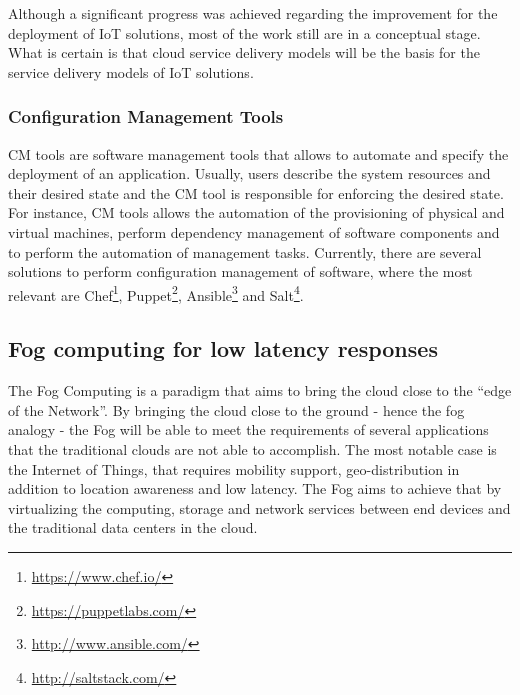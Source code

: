 Although a significant progress was achieved regarding the improvement for the deployment of \gls{IoT}
solutions, most of the work still are in a conceptual stage. What is certain is that cloud service
delivery models will be the basis for the service delivery models of \gls{IoT} solutions.

\subsubsection{Configuration Management Tools}
\label{subs:cm_tools}
\gls{CM} tools are software management tools that allows to automate and specify the deployment of an
application. Usually, users describe the system resources and their desired state and the \gls{CM}
tool is responsible for enforcing the desired state. For instance, \gls{CM} tools allows the automation
of the provisioning of physical and virtual machines, perform dependency management of software
components and to perform the automation of management tasks. Currently, there are several solutions
to perform configuration management of software, where the most relevant are Chef\footnote{\url{https://www.chef.io/}},
Puppet\footnote{\url{https://puppetlabs.com/}}, Ansible\footnote{\url{http://www.ansible.com/}} and
Salt\footnote{\url{http://saltstack.com/}}.

\subsection{Fog computing for low latency responses}
\label{sub:fog_computing}
The Fog Computing \cite{bonomi2012fog} is a paradigm that aims to bring the cloud close to the ``edge
of the Network''. By bringing the cloud close to the ground - hence the fog analogy - the Fog will be
able to meet the requirements of several applications that the traditional clouds are not able to
accomplish. The most notable case is the Internet of Things, that requires mobility support,
geo-distribution in addition to location awareness and low latency. The Fog aims to achieve that by
virtualizing the computing, storage and network services between end devices and the
traditional data centers in the cloud.

